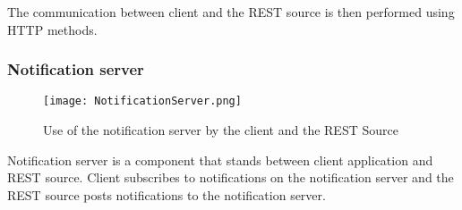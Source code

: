 The communication between client and the REST source is then performed using HTTP methods.

\subsubsection{Notification server}

\begin{figure}[ht!]
\centering
\texttt{[image: NotificationServer.png]}
\caption{Use of the notification server by the client and the REST Source \label{fig:5}}
\end{figure}

Notification server is a component that stands between client application and REST source. Client subscribes to notifications on the notification server and the REST source posts notifications to the notification server. 
